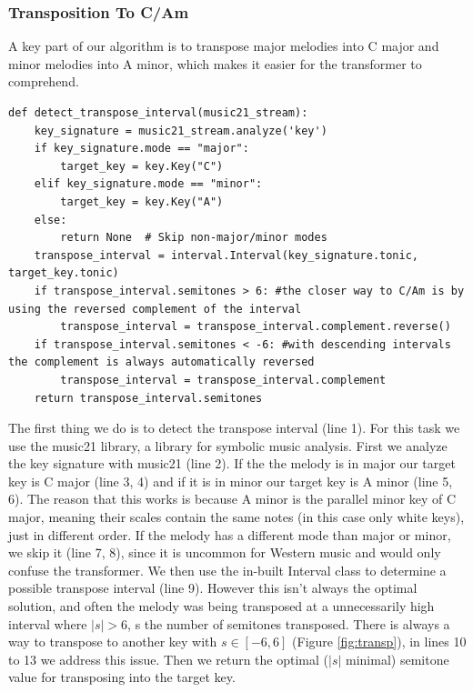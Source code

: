 \documentclass[a4paper,12pt]{extarticle}
\begin{document}
\subsubsection{Transposition To C/Am}
A key part of our algorithm is to transpose major melodies into C major and minor melodies into A minor, which makes it easier for the transformer to comprehend. \vspace{0.2cm}
\begin{lstlisting}
def detect_transpose_interval(music21_stream):
    key_signature = music21_stream.analyze('key')
    if key_signature.mode == "major":
        target_key = key.Key("C")
    elif key_signature.mode == "minor":
        target_key = key.Key("A")
    else:
        return None  # Skip non-major/minor modes
    transpose_interval = interval.Interval(key_signature.tonic, target_key.tonic)
    if transpose_interval.semitones > 6: #the closer way to C/Am is by using the reversed complement of the interval
        transpose_interval = transpose_interval.complement.reverse()
    if transpose_interval.semitones < -6: #with descending intervals the complement is always automatically reversed
        transpose_interval = transpose_interval.complement
    return transpose_interval.semitones
\end{lstlisting}
\vspace{0.2cm}
The first thing we do is to detect the transpose interval (line 1). For this task we use the music21 library, a library for symbolic music analysis. First we analyze the key signature with music21 (line 2). If the the melody is in major our target key is C major (line 3, 4) and if it is in minor our target key is A minor (line 5, 6). The reason that this works is because A minor is the parallel minor key of C major, meaning their scales contain the same notes (in this case only white keys), just in different order. If the melody has a different mode than major or minor, we skip it (line 7, 8), since it is uncommon for Western music and would only confuse the transformer. We then use the in-built Interval class to determine a possible transpose interval (line 9). However this isn't always the optimal solution, and often the melody was being transposed at a unnecessarily high interval where $|s| > 6$, s the number of semitones transposed. There is always a way to transpose to another key with $s \in [-6, 6]$ (Figure \ref{fig:transp}), in lines 10 to 13 we address this issue. Then we return the optimal ($|s|$ minimal) semitone value for transposing into the target key. \newline
\end{document}
